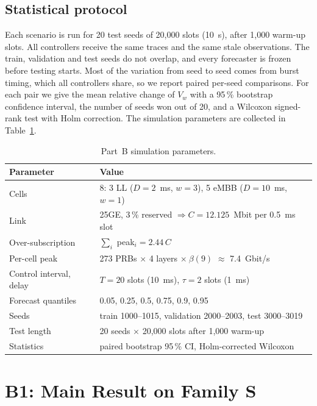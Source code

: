 \subsection{Statistical protocol}

Each scenario is run for 20 test seeds of 20{,}000 slots (10~s), after 1{,}000 warm-up slots. All controllers receive the same traces and the same stale observations. The train, validation and test seeds do not overlap, and every forecaster is frozen before testing starts. Most of the variation from seed to seed comes from burst timing, which all controllers share, so we report paired per-seed comparisons. For each pair we give the mean relative change of $V_w$ with a 95\,\% bootstrap confidence interval, the number of seeds won out of 20, and a Wilcoxon signed-rank test with Holm correction. The simulation parameters are collected in Table~\ref{tab:b-params}.

\begin{table}[H]
\caption{Part~B simulation parameters.}
\label{tab:b-params}
\centering\small
\begin{tabular}{ll}
\toprule
Parameter & Value \\
\midrule
Cells & 8: 3 LL ($D = 2$~ms, $w = 3$), 5 eMBB ($D = 10$~ms, $w = 1$) \\
Link & 25GE, 3\,\% reserved $\Rightarrow C = 12.125$~Mbit per 0.5~ms slot \\
Over-subscription & $\sum_i$ peak$_i = 2.44\,C$ \\
Per-cell peak & 273 PRBs $\times$ 4 layers $\times\ \beta(9)$ $\approx$ 7.4~Gbit/s \\
Control interval, delay & $T = 20$ slots (10~ms), $\tau = 2$ slots (1~ms) \\
Forecast quantiles & 0.05, 0.25, 0.5, 0.75, 0.9, 0.95 \\
Seeds & train 1000--1015, validation 2000--2003, test 3000--3019 \\
Test length & 20 seeds $\times$ 20{,}000 slots after 1{,}000 warm-up \\
Statistics & paired bootstrap 95\,\% CI, Holm-corrected Wilcoxon \\
\bottomrule
\end{tabular}
\end{table}

\section{B1: Main Result on Family S}
\label{sec:rb-main}

